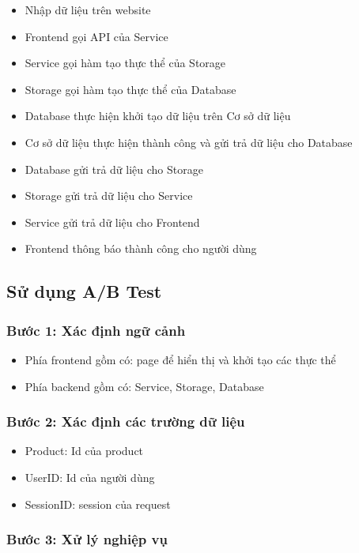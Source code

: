 \begin{itemize}
	\item Nhập dữ liệu trên website
	\item Frontend gọi API của Service
	\item Service gọi hàm tạo thực thể của Storage
	\item Storage gọi hàm tạo thực thể của Database
	\item Database thực hiện khởi tạo dữ liệu trên Cơ sở dữ liệu
	\item Cơ sở dữ liệu thực hiện thành công và gửi trả dữ liệu cho Database
	\item Database gửi trả dữ liệu cho Storage
	\item Storage gửi trả dữ liệu cho Service
	\item Service gửi trả dữ liệu cho Frontend
	\item Frontend thông báo thành công cho người dùng
\end{itemize}

\subsection{Sử dụng A/B Test}

\subsubsection{Bước 1: Xác định ngữ cảnh}

\begin{itemize}
	\item Phía frontend gồm có: page để hiển thị và khởi tạo các thực thể
	\item Phía backend gồm có: Service, Storage, Database
\end{itemize}

\subsubsection{Bước 2: Xác định các trường dữ liệu}

\begin{itemize}
	\item Product: Id của product
	\item UserID: Id của người dùng
	\item SessionID: session của request
\end{itemize}

\subsubsection{Bước 3: Xử lý nghiệp vụ}

